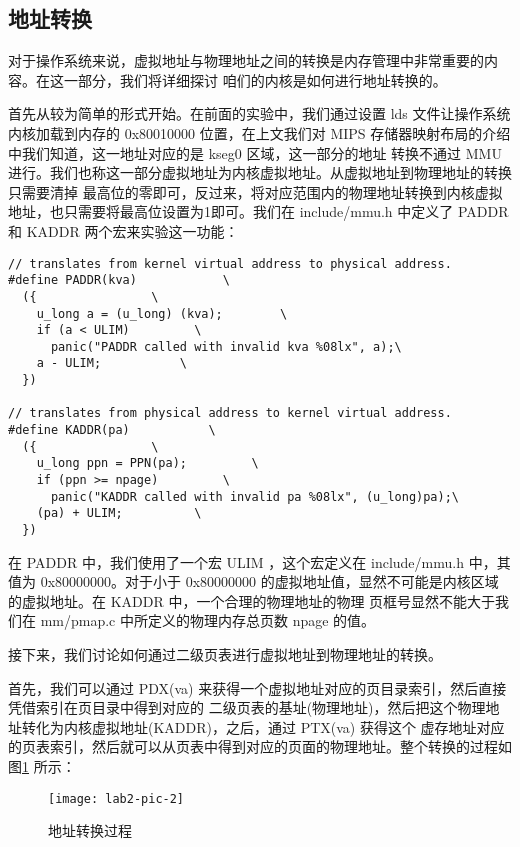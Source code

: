 \subsection{地址转换}

对于操作系统来说，虚拟地址与物理地址之间的转换是内存管理中非常重要的内容。在这一部分，我们将详细探讨
咱们的内核是如何进行地址转换的。

首先从较为简单的形式开始。在前面的实验中，我们通过设置 lds 文件让操作系统内核加载到内存的 0x80010000
位置，在上文我们对 MIPS 存储器映射布局的介绍中我们知道，这一地址对应的是 kseg0 区域，这一部分的地址
转换不通过 MMU 进行。我们也称这一部分虚拟地址为内核虚拟地址。从虚拟地址到物理地址的转换只需要清掉
最高位的零即可，反过来，将对应范围内的物理地址转换到内核虚拟地址，也只需要将最高位设置为1即可。我们在
 include/mmu.h 中定义了 PADDR 和 KADDR 两个宏来实验这一功能：

\begin{verbatim}
// translates from kernel virtual address to physical address.
#define PADDR(kva)            \
  ({                \
    u_long a = (u_long) (kva);        \
    if (a < ULIM)         \
      panic("PADDR called with invalid kva %08lx", a);\
    a - ULIM;           \
  })

// translates from physical address to kernel virtual address.
#define KADDR(pa)           \
  ({                \
    u_long ppn = PPN(pa);         \
    if (ppn >= npage)         \
      panic("KADDR called with invalid pa %08lx", (u_long)pa);\
    (pa) + ULIM;          \
  })
\end{verbatim}

在 PADDR 中，我们使用了一个宏 ULIM ，这个宏定义在 include/mmu.h 中，其值为 0x80000000。对于小于
 0x80000000 的虚拟地址值，显然不可能是内核区域的虚拟地址。在 KADDR 中，一个合理的物理地址的物理
页框号显然不能大于我们在 mm/pmap.c 中所定义的物理内存总页数 npage 的值。

接下来，我们讨论如何通过二级页表进行虚拟地址到物理地址的转换。

首先，我们可以通过 PDX(va) 来获得一个虚拟地址对应的页目录索引，然后直接凭借索引在页目录中得到对应的
二级页表的基址(物理地址)，然后把这个物理地址转化为内核虚拟地址(KADDR)，之后，通过 PTX(va) 获得这个
虚存地址对应的页表索引，然后就可以从页表中得到对应的页面的物理地址。整个转换的过程如 图\ref{lab2-pic-2}
所示：

\begin{figure}[htbp]
  \centering
  \texttt{[image: lab2-pic-2]}
  \caption{地址转换过程}\label{lab2-pic-2}
\end{figure}

